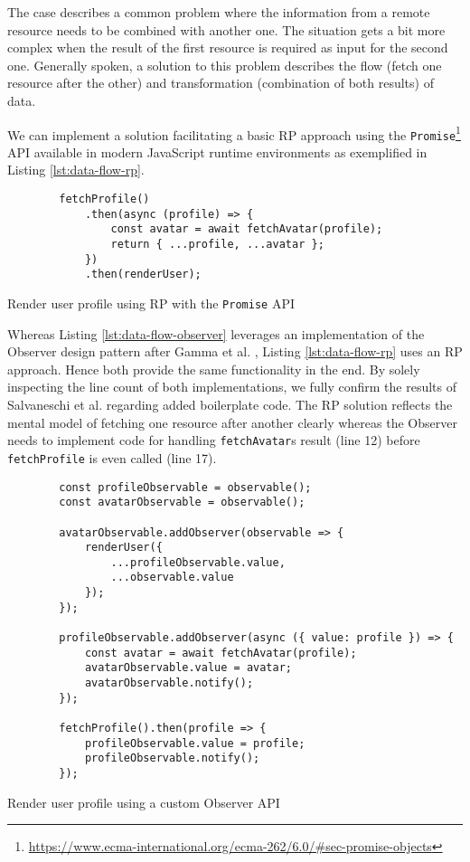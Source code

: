 \documentclass[12pt,a4paper]{article}
\begin{document}
The case describes a common problem where the information from a remote resource needs to be combined with another one. The situation gets a bit more complex when the result of the first resource is required as input for the second one. Generally spoken, a solution to this problem describes the flow (fetch one resource after the other) and transformation (combination of both results) of data.

We can implement a solution facilitating a basic RP approach using the \texttt{Promise}\footnote{\url{https://www.ecma-international.org/ecma-262/6.0/\#sec-promise-objects}} API available in modern JavaScript runtime environments as exemplified in Listing \ref{lst:data-flow-rp}.

\begin{listing}[H]
	\begin{verbatim}
		fetchProfile()
			.then(async (profile) => {
				const avatar = await fetchAvatar(profile);
				return { ...profile, ...avatar };
			})
			.then(renderUser);
	\end{verbatim}
	\caption{Render user profile using RP with the \texttt{Promise} API}
	\label{lst:data-flow-rp}
\end{listing}

Whereas Listing \ref{lst:data-flow-observer} leverages an implementation of the Observer design pattern after Gamma et al. \cite{gamma1995design}, Listing \ref{lst:data-flow-rp} uses an RP approach. Hence both provide the same functionality in the end. By solely inspecting the line count of both implementations, we fully confirm the results of Salvaneschi et al. \cite{7827078} regarding added boilerplate code. The RP solution reflects the mental model of fetching one resource after another clearly whereas the Observer needs to implement code for handling \texttt{fetchAvatar}s result (line 12) before \texttt{fetchProfile} is even called (line 17).

\begin{listing}[H]
	\begin{verbatim}
		const profileObservable = observable();
		const avatarObservable = observable();

		avatarObservable.addObserver(observable => {
			renderUser({
				...profileObservable.value,
				...observable.value
			});
		});

		profileObservable.addObserver(async ({ value: profile }) => {
			const avatar = await fetchAvatar(profile);
			avatarObservable.value = avatar;
			avatarObservable.notify();
		});

		fetchProfile().then(profile => {
			profileObservable.value = profile;
			profileObservable.notify();
		});
	\end{verbatim}
	\caption{Render user profile using a custom Observer API}
	\label{lst:data-flow-observer}
\end{listing}
\end{document}
